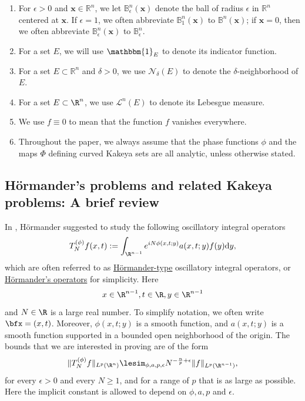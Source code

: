 \documentclass{article}
\numberwithin{equation}{section}
\theoremstyle{plain}
\begin{document}
\begin{enumerate}
\item For $\epsilon>0$ and $\mathbf{x} \in \mathbb{R}^n$, we let $\mathbb{B}_\epsilon^n(\mathbf{x})$ denote the ball of radius $\epsilon$ in $\mathbb{R}^n$ centered at $\mathbf{x}$. If $\epsilon=1$, we often abbreviate $\mathbb{B}_1^n(\mathbf{x})$ to $\mathbb{B}^n(\mathbf{x})$; if $\mathbf{x}=0$, then we often abbreviate $\mathbb{B}_\epsilon^n(\mathbf{x})$ to $\mathbb{B}_\epsilon^n$.

\item For a set $E$, we will use $\mathbbm{1}_E$ to denote its indicator function. 

\item For a set $E \subset \mathbb{R}^n$ and $\delta>0$, we use $\mathcal{N}_\delta(E)$ to denote the $\delta$-neighborhood of $E$. 

\item For a set $E\subset \R^n$, we use $\mathcal{L}^n(E)$ to denote its Lebesgue measure. 

\item We use $f\equiv 0$ to mean that the function $f$ vanishes everywhere. 

\item Throughout the paper, we always assume that the phase functions $\phi$ and the  maps $\Phi$ defining curved Kakeya sets are all analytic, unless otherwise stated. %
\end{enumerate}






\subsection{H\"ormander's problems and related Kakeya problems: A brief review}\label{250708subsection1_1}


In \cite{Hor73}, H\"ormander suggested to study the following  oscillatory integral operators
\begin{equation}\label{230717e1_1}
T^{(\phi)}_N f(x, t):=\int_{\R^{n-1}} e^{i N \phi(x, t; y)} a(x, t; y) f(y) \mathrm{d} y,
\end{equation}
which are often referred to as \underline{H\"ormander-type} oscillatory integral operators, or \underline{H\"ormander's operators} for simplicity. 
Here 
\begin{equation}
x\in \R^{n-1}, t\in \R, y\in \R^{n-1}
\end{equation}
 and $N\in \R$ is a large real number. To simplify notation, we often write $\bfx=(x, t)$. Moreover, $\phi(x, t; y)$ is a smooth function, and  $a(x, t; y)$ is a smooth function supported in a bounded open neighborhood of the origin. The bounds that we are interested in proving are of the form 
\begin{equation}\label{250708e1_2}
\|T^{(\phi)}_N f\|_{L^p(\R^n)}\lesim_{\phi, a, p, \epsilon} N^{-\frac{n}{p}+\epsilon} \|f\|_{L^p(\R^{n-1})},
\end{equation}
for every $\epsilon>0$ and every $N\ge 1$, and for a range of $p$ that is as large as possible. Here the implicit constant is allowed to depend on $\phi, a, p$ and $\epsilon.$\\
\end{document}
